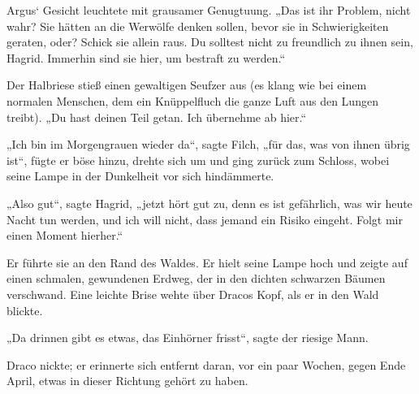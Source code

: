 Argus‘ Gesicht leuchtete mit grausamer Genugtuung. „Das ist ihr Problem, nicht wahr? Sie hätten an die Werwölfe denken sollen, bevor sie in Schwierigkeiten geraten, oder? Schick sie allein raus. Du solltest nicht zu freundlich zu ihnen sein, Hagrid. Immerhin sind sie hier, um bestraft zu werden.“

Der Halbriese stieß einen gewaltigen Seufzer aus (es klang wie bei einem normalen Menschen, dem ein Knüppelfluch die ganze Luft aus den Lungen treibt). „Du hast deinen Teil getan. Ich übernehme ab hier.“

„Ich bin im Morgengrauen wieder da“, sagte Filch, „für das, was von ihnen übrig ist“, fügte er böse hinzu, drehte sich um und ging zurück zum Schloss, wobei seine Lampe in der Dunkelheit vor sich hindämmerte.

„Also gut“, sagte Hagrid, „jetzt hört gut zu, denn es ist gefährlich, was wir heute Nacht tun werden, und ich will nicht, dass jemand ein Risiko eingeht. Folgt mir einen Moment hierher.“

Er führte sie an den Rand des Waldes. Er hielt seine Lampe hoch und zeigte auf einen schmalen, gewundenen Erdweg, der in den dichten schwarzen Bäumen verschwand. Eine leichte Brise wehte über Dracos Kopf, als er in den Wald blickte.

„Da drinnen gibt es etwas, das Einhörner frisst“, sagte der riesige Mann.

Draco nickte; er erinnerte sich entfernt daran, vor ein paar Wochen, gegen Ende April, etwas in dieser Richtung gehört zu haben.

